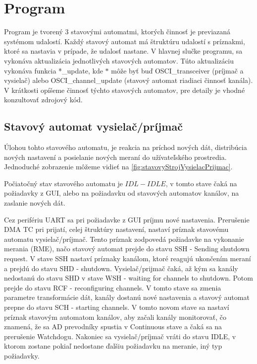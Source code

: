 \documentclass[main.tex]{subfiles}
\begin{document}
	\section{Program}
		\begin{multicols*}{2}
			\noindent Program je tvorený 3 stavovými automatmi, ktorých činnosť je previazaná systémom udalostí. Každý stavový automat má štruktúru udalostí s  príznakmi, ktoré sa nastavia v prípade, že udalosť nastane. V hlavnej slučke programu, sa vykonáva aktualizácia jednotlivých stavových automatov. Túto aktualizáciu vykonáva funkcia *\_update, kde $*$ môže byť buď OSCI\_transceiver (príjmač a vysielač) alebo OSCI\_channel\_update (stavový automat riadiaci činnosť kanála). V krátkosti opíšeme činnosť týchto stavových automatov, pre detaily je vhodné konzultovať zdrojový kód. %
			
			\subsection{Stavový automat vysielač/príjmač}
			Úlohou tohto stavového automatu, je reakcia na príchod nových dát, distribúcia nových nastavení a posielanie nových meraní do užívateľského prostredia. Jednoduché zobrazenie môžeme vidieť na \cref{fig:stavovyStrojVysielacPrijmac}.
			
			
			Počiatočný stav stavového automatu je $IDL-IDLE$, v tomto stave čaká na požiadavky z GUI, alebo na požiadavku od stavových automatov kanálov, na zaslanie nových dát.
			
			Cez perifériu UART sa pri požiadavke z GUI príjmu nové nastavenia. Prerušenie DMA TC pri prijatí, celej štruktúry nastavení, nastaví príznak stavovému automatu vysielač/príjmač. Tento príznak zodpovedá požiadavke na vykonanie merania (RME), načo stavový automat prejde do stavu SSH - Sending shutdown request. V stave SSH nastaví príznaky kanálom, ktoré reagujú ukončením meraní a prejdú do stavu SHD - shutdown. Vysielač/prijmač čaká, až kým sa kanály nedostanú do stavu SHD v stave WSH - waiting for channels to shutdown. Potom prejde do stavu RCF - reconfiguring channels. V tomto stave sa zmenia parametre transformácie dát, kanály dostanú nové nastavenia a stavový automat prepne do stavu SCH - starting channels. V tomto novom stave sa nastaví príznak stavovým automatom kanálov, aby začali kanály monitorovať, čo znamená, že sa AD prevodníky spustia v Continuous stave a čaká sa na prerušenie Watchdogu. Nakoniec sa vysielač/príjmač vráti do stavu IDLE, v ktorom zostane pokiaľ nedostane ďalšiu požiadavku na meranie, iný typ požiadavky.
			

\end{multicols*}
\end{document}
